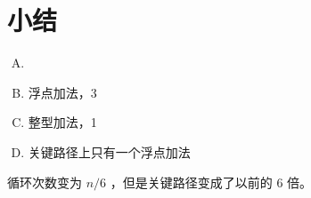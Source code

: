 
\section{小结}
{
    \begin{practicec}
        \begin{enumerate}[A.]
            \item {}
            \item 浮点加法，3
            \item 整型加法，1
            \item 关键路径上只有一个浮点加法
        \end{enumerate}
    \end{practicec}

    \begin{practicec}
        循环次数变为 $n / 6$ ，但是关键路径变成了以前的 $6$ 倍。
    \end{practicec}

    \begin{practicec}
    \end{practicec}

    \begin{practicec}

    \end{practicec}
}
